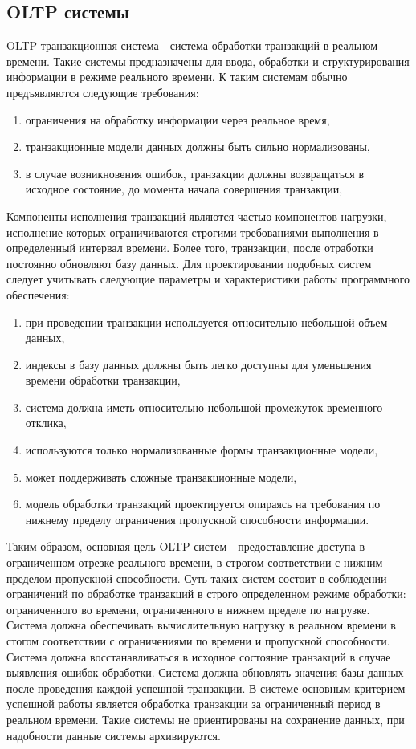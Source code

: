 \subsection{OLTP системы}\label{sec:ch2/sec1/sub2}
OLTP  транзакционная система - система обработки транзакций в реальном времени. Такие системы предназначены для ввода, обработки и структурирования информации в режиме реального времени. К таким системам обычно предъявляются следующие требования:
\begin{enumerate}
 	\item ограничения на обработку информации через реальное время, 
 	\item транзакционные модели данных должны быть сильно нормализованы,
 	\item в случае возникновения ошибок, транзакции должны возвращаться в исходное состояние, до момента начала совершения транзакции,
 \end{enumerate}
Компоненты исполнения транзакций являются частью компонентов нагрузки, исполнение которых ограничиваются строгими требованиями выполнения в определенный интервал времени. Более того, транзакции, после отработки постоянно обновляют базу данных. Для проектировании подобных систем следует учитывать следующие параметры и характеристики работы программного обеспечения:
\begin{enumerate}
	\item при проведении транзакции используется относительно небольшой объем данных,
	\item индексы в базу данных должны быть легко доступны для уменьшения времени обработки транзакции,
	\item система должна иметь относительно небольшой промежуток временного отклика,
	\item используются только нормализованные формы транзакционные модели,
	\item может поддерживать сложные транзакционные модели,
	\item модель обработки транзакций проектируется опираясь на требования по нижнему пределу ограничения пропускной способности информации.
\end{enumerate}
Таким образом, основная цель OLTP систем - предоставление доступа в ограниченном отрезке реального времени, в строгом соответствии с нижним пределом пропускной способности. Суть таких систем состоит в соблюдении ограничений по обработке транзакций в строго определенном режиме обработки: ограниченного во времени, ограниченного в нижнем пределе по нагрузке. Система должна обеспечивать вычислительную нагрузку в реальном времени в стогом соответствии с ограничениями по времени и пропускной способности. Система должна восстанавливаться  в исходное состояние транзакций в случае выявления ошибок обработки. Система должна обновлять значения базы данных после проведения каждой успешной транзакции. В системе основным критерием успешной работы является обработка транзакции за ограниченный период в реальном времени. Такие системы не ориентированы на сохранение данных, при надобности данные системы архивируются.

